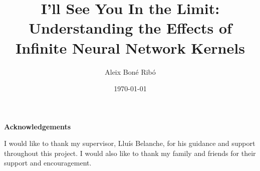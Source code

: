 


\usepackage{xspace}
\newcommand{\libsvm}{\texttt{libsvm}\xspace}

\newcommand{\R}{\mathbb{R}}

\newcommand{\threshold}{$>10$\xspace}

\makeatletter
\patchcmd{\@chapter}%
  {\addtocontents}%
  {%
   \addtocontents}%
  {}{}%
\makeatother


\renewcommand\and{\\[\baselineskip]}

\title{I'll See You In the Limit:
 Understanding the Effects of Infinite Neural Network Kernels}
\author{Aleix Boné Ribó}
\date{\today}



% 
% 
\cleardoublepage

\thispagestyle{empty}
\null\vspace{15em}
\begin{center}
    {
        \Large
        \bfseries Acknowledgements
    }
    \vspace{3em}

    I would like to thank my supervisor, Lluís Belanche, for his guidance and
    support throughout this project. I would also like to thank my family and
    friends for their support and encouragement.
\end{center}

